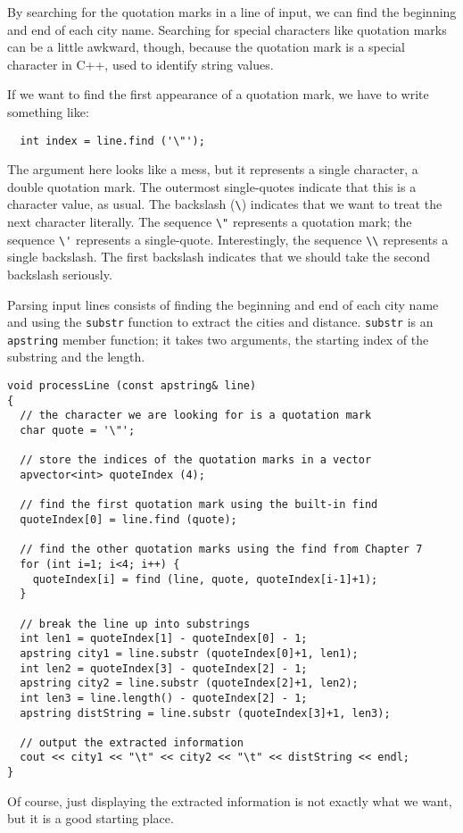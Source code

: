 By searching for the quotation marks in a line of input, we
can find the beginning and end of each city name.
Searching for special characters like quotation marks can be a little
awkward, though, because the quotation mark is a special character
in C++, used to identify string values.

If we want to find the
first appearance of a quotation mark, we have to write something
like:

\begin{verbatim}
  int index = line.find ('\"');
\end{verbatim}
%
The argument here looks like a mess, but it represents a single
character, a double quotation mark.  The outermost single-quotes
indicate that this is a character value, as usual.  The backslash
(\verb+\+) indicates that we want to treat the next character
literally.  The sequence \verb+\"+ represents a quotation mark; the
sequence \verb+\'+ represents a single-quote.  Interestingly, the
sequence \verb+\\+ represents a single backslash.  The first backslash
indicates that we should take the second backslash seriously.


Parsing input lines consists of finding the beginning and
end of each city name and using
the {\tt substr} function to extract the cities and distance.
{\tt substr} is an {\tt apstring} member function;
it takes two arguments, the starting index of the substring
and the length.


\begin{verbatim}
void processLine (const apstring& line)
{
  // the character we are looking for is a quotation mark
  char quote = '\"';

  // store the indices of the quotation marks in a vector
  apvector<int> quoteIndex (4);

  // find the first quotation mark using the built-in find
  quoteIndex[0] = line.find (quote);

  // find the other quotation marks using the find from Chapter 7
  for (int i=1; i<4; i++) {
    quoteIndex[i] = find (line, quote, quoteIndex[i-1]+1);
  }

  // break the line up into substrings
  int len1 = quoteIndex[1] - quoteIndex[0] - 1;
  apstring city1 = line.substr (quoteIndex[0]+1, len1);
  int len2 = quoteIndex[3] - quoteIndex[2] - 1;
  apstring city2 = line.substr (quoteIndex[2]+1, len2);
  int len3 = line.length() - quoteIndex[2] - 1;
  apstring distString = line.substr (quoteIndex[3]+1, len3);

  // output the extracted information
  cout << city1 << "\t" << city2 << "\t" << distString << endl;
}
\end{verbatim}
%
Of course, just displaying the extracted information is not
exactly what we want, but it is a good starting place.

